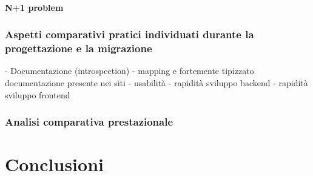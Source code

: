 \paragraph{N+1 problem}
\subsubsection{Aspetti comparativi pratici individuati durante la progettazione e la migrazione}
- Documentazione (introspection)
- mapping e fortemente tipizzato
  documentazione presente nei siti
- usabilità
- rapidità sviluppo backend
- rapidità sviluppo frontend
\subsubsection{Analisi comparativa prestazionale}
\section{Conclusioni}





